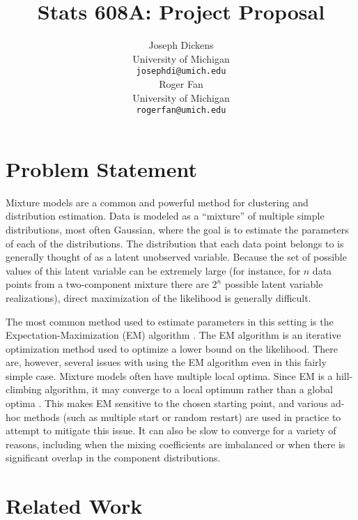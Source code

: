 \documentclass{article}
\theoremstyle{definition}
\begin{document}
\title{Stats 608A: Project Proposal}
\author{
  Joseph Dickens \\
  University of Michigan \\
  \texttt{josephdi@umich.edu} \\
\And
  Roger Fan \\
  University of Michigan\\
  \texttt{rogerfan@umich.edu} \\
}

\maketitle


\section{Problem Statement}

Mixture models are a common and powerful method for clustering and distribution estimation. Data is modeled as a ``mixture'' of multiple simple distributions, most often Gaussian, where the goal is to estimate the parameters of each of the distributions. The distribution that each data point belongs to is generally thought of as a latent unobserved variable. Because the set of possible values of this latent variable can be extremely large (for instance, for $n$ data points from a two-component mixture there are $2^n$ possible latent variable realizations), direct maximization of the likelihood is generally difficult.

The most common method used to estimate parameters in this setting is the Expectation-Maximization (EM) algorithm \cite{dempsterlairdrubin77}. The EM algorithm is an iterative optimization method used to optimize a lower bound on the likelihood. There are, however, several issues with using the EM algorithm even in this fairly simple case. Mixture models often have multiple local optima. Since EM is a hill-climbing algorithm, it may converge to a local optimum rather than a global optima \cite{wu83}. This makes EM sensitive to the chosen starting point, and various ad-hoc methods (such as multiple start or random restart) are used in practice to attempt to mitigate this issue. It can also be slow to converge for a variety of reasons, including when the mixing coefficients are imbalanced or when there is significant overlap in the component distributions.


\section{Related Work} \label{sec:related_work}
\end{document}
